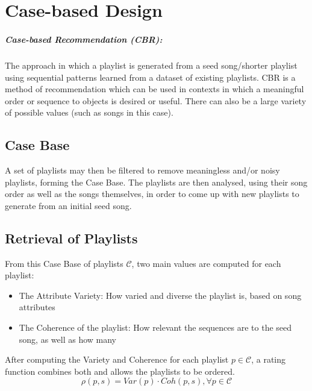 \documentclass[a4paper, 12pt]{report}
\begin{document}
\chapter{Case-based Design}\label{casedesign}
\paragraph{Case-based Recommendation (CBR):}
The approach in which a playlist is generated from a seed song/shorter playlist using sequential patterns 
learned from a dataset of existing playlists.
CBR is a method of recommendation which can be used in contexts in which a meaningful order or sequence to objects is desired or useful.
There can also be a large variety of possible values (such as songs in this case).

\section{Case Base}
A set of playlists may then be filtered to remove meaningless and/or noisy playlists, forming the Case Base.
The playlists are then analysed, using their song order as well as the songs themselves, in order to 
come up with new playlists to generate from an initial seed song.

\section{Retrieval of Playlists}
From this Case Base of playlists \(\mathcal{C}\), two main values are computed for each playlist:
\begin{itemize}
    \item The Attribute Variety: How varied and diverse the playlist is, based on song attributes
    \item The Coherence of the playlist: How relevant the sequences are to the seed song, as well as how many
\end{itemize}

After computing the Variety and Coherence for each playlist \(p\in\mathcal{C}\), a rating function combines both and allows the playlists to be ordered.
\[\rho(p, s) = Var(p) \cdot Coh(p, s), \forall p \in \mathcal{C}\]
\end{document}
